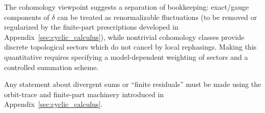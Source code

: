\begin{remark}
The cohomology viewpoint suggests a separation of bookkeeping:
exact/gauge components of $\delta$ can be treated as renormalizable fluctuations (to be removed or regularized by the finite-part prescriptions developed in Appendix~\ref{sec:cyclic_calculus}),
while nontrivial cohomology classes provide discrete topological sectors which do not cancel by local rephasings.
Making this quantitative requires specifying a model-dependent weighting of sectors and a controlled summation scheme.
\end{remark}

Any statement about divergent sums or ``finite residuals'' must be made using the orbit-trace and finite-part machinery introduced in Appendix~\ref{sec:cyclic_calculus}.
